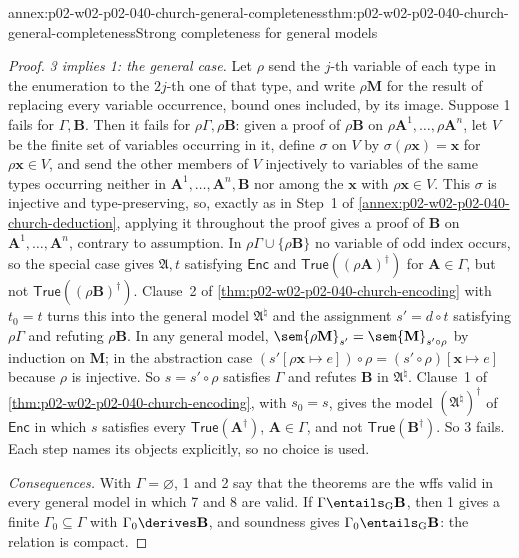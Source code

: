 \begin{annexitem}{annex:p02-w02-p02-040-church-general-completeness}{thm:p02-w02-p02-040-church-general-completeness}{Strong completeness for general models}
\begin{proof}
\emph{3 implies 1: the general case.}  Let \(\rho\) send the \(j\)-th variable
of each type in the enumeration to the \(2j\)-th one of that type, and
write \(\rho\mathbf M\) for the result of replacing every variable occurrence,
bound ones included, by its image.  Suppose 1 fails for \(\Gamma,\mathbf B\).
Then it fails for \(\rho\Gamma,\rho\mathbf B\): given a proof of \(\rho\mathbf B\) on
\(\rho\mathbf A^1,\ldots,\rho\mathbf A^n\), let \(V\) be the finite set of
variables occurring in it, define \(\sigma\) on \(V\) by
\(\sigma(\rho\mathbf x)=\mathbf x\) for \(\rho\mathbf x\in V\), and send the other
members of \(V\) injectively to variables of the same types occurring
neither in \(\mathbf A^1,\ldots,\mathbf A^n,\mathbf B\) nor among the \(\mathbf x\) with
\(\rho\mathbf x\in V\).  This \(\sigma\) is injective and type-preserving, so,
exactly as in Step~1 of \cref{annex:p02-w02-p02-040-church-deduction}, applying
it throughout the proof gives a proof of \(\mathbf B\) on
\(\mathbf A^1,\ldots,\mathbf A^n\), contrary to assumption.  In
\(\rho\Gamma\cup\{\rho\mathbf B\}\) no variable of odd index occurs, so the
special case gives \(\mathfrak A,t\) satisfying \(\mathsf{Enc}\) and
\(\mathsf{True}((\rho\mathbf A)^\dagger)\) for \(\mathbf A\in\Gamma\), but not
\(\mathsf{True}((\rho\mathbf B)^\dagger)\).  Clause~2 of
\cref{thm:p02-w02-p02-040-church-encoding} with \(t_0=t\) turns this into the
general model \(\mathfrak A^\natural\) and the assignment \(s'=d\circ t\)
satisfying \(\rho\Gamma\) and refuting \(\rho\mathbf B\).  In any general model,
\(\sem{\rho\mathbf M}_{s'}=\sem{\mathbf M}_{s'\circ\rho}\) by induction on
\(\mathbf M\); in the abstraction case
\((s'[\rho\mathbf x\mapsto e])\circ\rho=(s'\circ\rho)[\mathbf x\mapsto e]\) because
\(\rho\) is injective.  So \(s=s'\circ\rho\) satisfies \(\Gamma\) and refutes
\(\mathbf B\) in \(\mathfrak A^\natural\).  Clause~1 of
\cref{thm:p02-w02-p02-040-church-encoding}, with \(s_0=s\), gives the model
\((\mathfrak A^\natural)^\dagger\) of \(\mathsf{Enc}\) in which \(s\) satisfies every
\(\mathsf{True}(\mathbf A^\dagger)\), \(\mathbf A\in\Gamma\), and not
\(\mathsf{True}(\mathbf B^\dagger)\).  So 3 fails.  Each step names its
objects explicitly, so no choice is used.

\emph{Consequences.}  With \(\Gamma=\varnothing\), 1 and 2 say that the
theorems are the wffs valid in every general model in which 7 and 8 are
valid.  If \(\Gamma\entails_{\mathrm G}\mathbf B\), then 1 gives a finite
\(\Gamma_0\subseteq\Gamma\) with \(\Gamma_0\derives\mathbf B\), and soundness gives
\(\Gamma_0\entails_{\mathrm G}\mathbf B\): the relation is compact.
\end{proof}
\end{annexitem}

